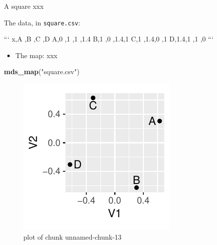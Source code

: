 \documentclass[ignorenonframetext,]{beamer}
\newenvironment{Shaded}{\begin{snugshade}}{\end{snugshade}}
\newcommand{\KeywordTok}[1]{\textcolor[rgb]{0.13,0.29,0.53}{\textbf{#1}}}
\newcommand{\NormalTok}[1]{#1}
\newcommand{\StringTok}[1]{\textcolor[rgb]{0.31,0.60,0.02}{#1}}
\providecommand{\tightlist}{%
  \setlength{\itemsep}{0pt}\setlength{\parskip}{0pt}}
\begin{document}
\begin{frame}[fragile]{A square xxx}
\protect\hypertarget{a-square-xxx}{}

The data, in \texttt{square.csv}:

\begin{small}

```
x,A  ,B  ,C  ,D
A,0  ,1  ,1  ,1.4
B,1  ,0  ,1.4,1
C,1  ,1.4,0  ,1
D,1.4,1  ,1  ,0
```
\end{small}

\begin{itemize}
\tightlist
\item
  The map: xxx
\end{itemize}

\begin{Shaded}
\begin{Highlighting}[]
\KeywordTok{mds_map}\NormalTok{(}\StringTok{"square.csv"}\NormalTok{)}
\end{Highlighting}
\end{Shaded}

\begin{figure}
\centering
\includegraphics{figure/unnamed-chunk-13-1.pdf}
\caption{plot of chunk unnamed-chunk-13}
\end{figure}

\end{frame}
\end{document}
